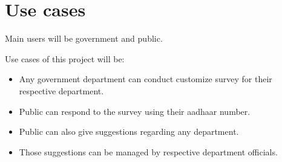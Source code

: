 \documentclass[journal]{IEEEtran}
\begin{document}
\section{Use cases}
Main users will be government and public. 

Use cases of this project will be:
\begin{itemize}
\item  Any government department can conduct customize survey for their respective department.
\item  Public can respond to the survey using their aadhaar number.
\item  Public can also give suggestions regarding any department.
\item Those suggestions can be managed by respective department officials.
\end{itemize}
  
    
\end{document}
